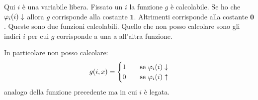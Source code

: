 Qui $i$ è una variabile libera. Fissato un $i$ la funzione $g$ è calcolabile. Se ho che $\varphi_{i}(i)
\downarrow$ allora $g$ corrisponde alla costante $\bm{1}$. Altrimenti corrisponde alla costante
$\bm{0}$. Queste sono due funzioni calcolabili. Quello che non posso calcolare sono gli indici $i$
per cui $g$ corrisponde a una a all'altra funzione.

In particolare non posso calcolare:
\begin{equation*}
    g(i,x) =
    \begin{cases}
        1 \quad &\text{se $\varphi_{i}(i) \downarrow$} \\
        0 \quad &\text{se $\varphi_{i}(i) \uparrow$} \\
    \end{cases}
\end{equation*}
analogo della funzione precedente ma in cui $i$ è legata.

